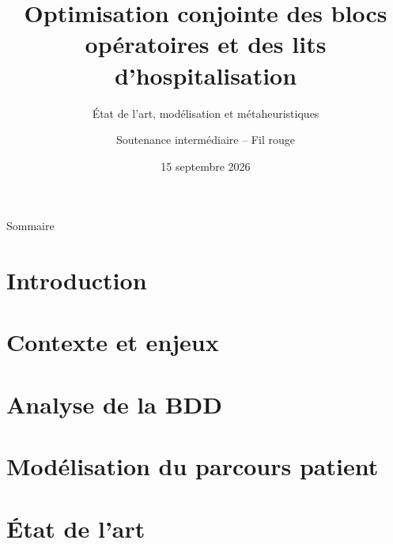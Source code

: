 \documentclass[aspectratio=169,11pt]{beamer}
\title[Optimisation blocs \& lits]{Optimisation conjointe des blocs opératoires et des lits d'hospitalisation}
\subtitle{État de l'art, modélisation et métaheuristiques}
\author{Soutenance intermédiaire -- Fil rouge}
\date{15 septembre 2026}
\begin{document}
\begin{frame}
  \titlepage
\end{frame}

\begin{frame}{Sommaire}
  \tableofcontents
\end{frame}

\section{Introduction}



\section{Contexte et enjeux}



\section{Analyse de la BDD}



\section{Modélisation du parcours patient}



\section{État de l'art}
\end{document}
